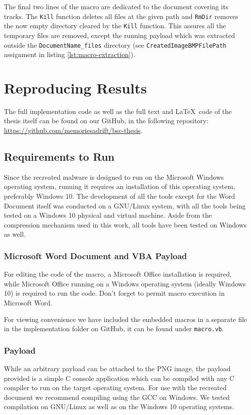 The final two lines of the macro are dedicated to the document covering its tracks. The \verb+Kill+ function deletes all
files at the given path and \verb+RmDir+ removes the now empty directory cleared by the \verb+Kill+ function. This
assures all the temporary files are removed, except the running payload which was extracted outside the \verb+DocumentName_files+
directory (see \verb+CreatedImageBMPFilePath+ assignment in listing \ref{lst:macro-extraction}).

\section{Reproducing Results}\label{sec:reproducing-results}
The full implementation code as well as the full text and \LaTeX\ code of the thesis itself can be found 
on our GitHub, in the following repository: \url{https://github.com/memoriesadrift/bsc-thesis}.

\subsection{Requirements to Run}
Since the recreated malware is designed to run on the Microsoft Windows operating system, running it requires
an installation of this operating system, preferably Windows 10. 
The development of all the tools except for the Word Document itself was conducted on a GNU/Linux system, with all
the tools being tested on a Windows 10 physical and virtual machine. Aside from the compression mechanism used in this
work, all tools have been tested on Windows as well.

\subsubsection{Microsoft Word Document and VBA Payload}
For editing the code of the macro, a Microsoft Office installation is required, while Microsoft Office running 
on a Windows operating system (ideally Windows 10) is required to run the code. Don't forget to permit macro 
execution in Microsoft Word. 

For viewing convenience we have included the embedded macros in a separate file in the implementation folder on
GitHub, it can be found under \verb+macro.vb+.

\subsubsection{Payload}
While an arbitrary payload can be attached to the \acrshort{PNG} image, the payload provided is a simple C console
application which can be compiled with any C compiler to run on the target operating system. For use with the 
recreated document we recommend compiling using the \acrfull{GCC} on Windows. We tested compilation on GNU/Linux
as well as on the Windows 10 operating systems.

